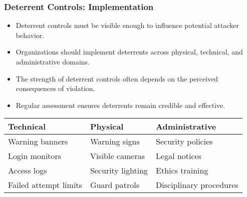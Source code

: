 \documentclass{beamer}
\begin{document}
\begin{frame}
    \frametitle{Deterrent Controls: Implementation}
    
    \begin{itemize}
        \item Deterrent controls must be visible enough to influence potential attacker behavior.
        
        \item Organizations should implement deterrents across physical, technical, and administrative domains.
        
        \item The strength of deterrent controls often depends on the perceived consequences of violation.
        
        \item Regular assessment ensures deterrents remain credible and effective.
    \end{itemize}
    
    \begin{table}
        \begin{tabular}{|l|l|l|}
            \hline
            \textbf{Technical} & \textbf{Physical} & \textbf{Administrative} \\
            \hline
            Warning banners & Warning signs & Security policies \\
            Login monitors & Visible cameras & Legal notices \\
            Access logs & Security lighting & Ethics training \\
            Failed attempt limits & Guard patrols & Disciplinary procedures \\
            \hline
        \end{tabular}
    \end{table}
\end{frame}
\end{document}
